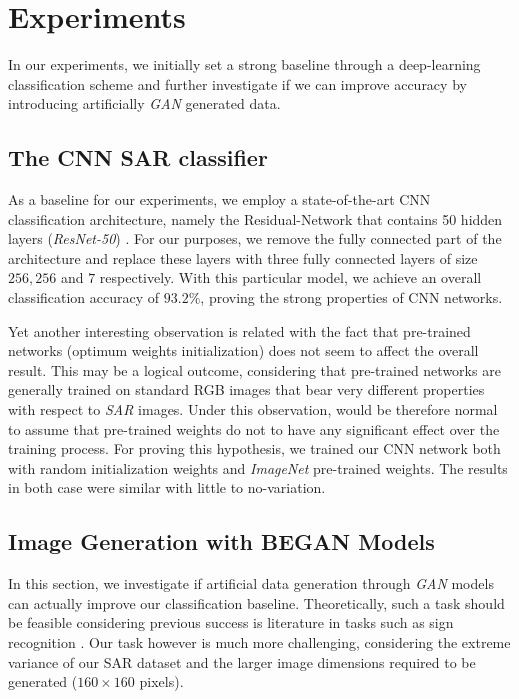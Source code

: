 \documentclass{article}
\begin{document}
\section{Experiments}
\label{sec:experimnts}

In our experiments, we initially set a strong baseline 
through a deep-learning classification scheme and 
further investigate if we can improve accuracy
by introducing artificially \emph{GAN} generated data.

\subsection{The CNN SAR classifier}

As a baseline for our experiments, we
employ a state-of-the-art CNN classification architecture,
namely the Residual-Network that contains 50 hidden layers 
(\emph{ResNet-50}) \cite{he2016deep}. 
%
For our purposes, we remove the fully connected part of
the architecture and replace these layers with
three fully connected layers of size $256, 256$ and $7$ respectively. 
With this particular model, we achieve
an overall classification accuracy of $93.2\%$, 
proving the strong properties of CNN networks. 

\bigskip

\noindent
Yet another interesting observation is related with the fact that pre-trained
networks (optimum weights initialization) does not seem 
to affect the overall result. 
%
This may be a logical outcome, considering that pre-trained
networks are generally trained on standard RGB images that
bear very different properties with respect to \emph{SAR} images.
%
Under this observation, would be therefore normal to assume
that pre-trained weights do not to have any significant effect over the 
training process.
%
For proving this hypothesis, we trained our CNN network both
with random initialization weights and \emph{ImageNet} pre-trained weights.
The results in both case were similar with little to no-variation.

\subsection{Image Generation with BEGAN Models}
%
In this section, we investigate if artificial data generation through \emph{GAN}
models can actually improve our classification baseline.
%
Theoretically, such a task should be feasible considering previous
success is literature in tasks such as sign recognition \cite{wang2017adversarial}.
%
Our task however is much more challenging, considering the extreme variance of our
SAR dataset and the larger image dimensions required to be generated ($160 \times 160$ pixels).
%
\end{document}
